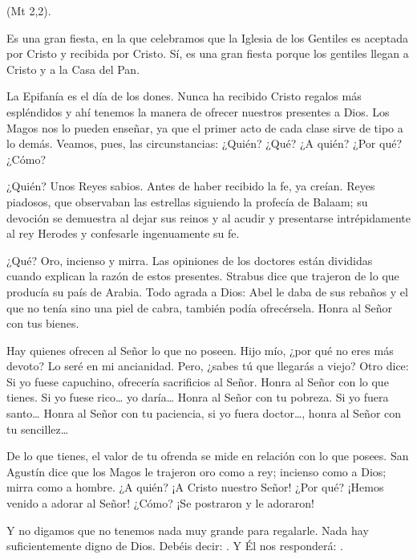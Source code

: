 			\begin{scripture}
				 (Mt 2,2).
				
				Es una gran fiesta, en la que celebramos que la Iglesia de los Gentiles es aceptada por Cristo y recibida por Cristo. Sí, es una gran fiesta porque los gentiles llegan a Cristo y a la Casa del Pan.
				
				La Epifanía es el día de los dones. Nunca ha recibido Cristo regalos más espléndidos y ahí tenemos la manera de ofrecer nuestros presentes a Dios. Los Magos nos lo pueden enseñar, ya que el primer acto de cada clase sirve de tipo a lo demás. Veamos, pues, las circunstancias: ¿Quién? ¿Qué? ¿A quién? ¿Por qué? ¿Cómo?
				
				¿Quién? Unos Reyes sabios. Antes de haber recibido la fe, ya creían. Reyes piadosos, que observaban las estrellas siguiendo la profecía de Balaam; su devoción se demuestra al dejar sus reinos y al acudir y presentarse intrépidamente al rey Herodes y confesarle ingenuamente su fe.
				
				¿Qué? Oro, incienso y mirra. Las opiniones de los doctores están divididas cuando explican la razón de estos presentes. Strabus dice que trajeron de lo que producía su país de Arabia. Todo agrada a Dios: Abel le daba de sus rebaños y el que no tenía sino una piel de cabra, también podía ofrecérsela. Honra al Señor con tus bienes.
				
				Hay quienes ofrecen al Señor lo que no poseen. Hijo mío, ¿por qué no eres más devoto? Lo seré en mi ancianidad. Pero, ¿sabes tú que llegarás a viejo? Otro dice: Si yo fuese capuchino, ofrecería sacrificios al Señor. Honra al Señor con lo que tienes. Si yo fuese rico\ldots{} yo daría\ldots{} Honra al Señor con tu pobreza. Si yo fuera santo\ldots{} Honra al Señor con tu paciencia, si yo fuera doctor\ldots{}, honra al Señor con tu sencillez\ldots{}
				
				De lo que tienes, el valor de tu ofrenda se mide en relación con lo que posees. San Agustín dice que los Magos le trajeron oro como a rey; incienso como a Dios; mirra como a hombre. ¿A quién? ¡A Cristo nuestro Señor! ¿Por qué? ¡Hemos venido a adorar al Señor! ¿Cómo? ¡Se postraron y le adoraron!
				
				Y no digamos que no tenemos nada muy grande para regalarle. Nada hay suficientemente digno de Dios. Debéis decir: . Y Él nos responderá: .
			\end{scripture}
		
